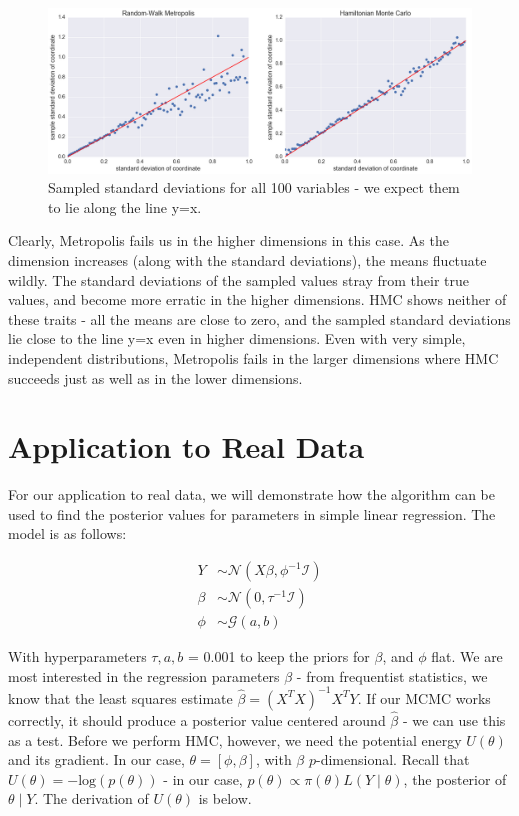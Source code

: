 \documentclass{article}
\numberwithin{equation}{section}
\begin{document}
\begin{figure}[H]
\centering
  \includegraphics[width=1\linewidth]{100d_sds.png}
  \caption{Sampled standard deviations for all 100 variables - we expect them to lie along the line y=x.}
\label{100d_sds}
\end{figure}

Clearly, Metropolis fails us in the higher dimensions in this case. As the dimension increases (along with the standard deviations), the means fluctuate wildly. The standard deviations of the sampled values stray from their true values, and become more erratic in the higher dimensions. HMC shows neither of these traits - all the means are close to zero, and the sampled standard deviations lie close to the line y=x even in higher dimensions. Even with very simple, independent distributions, Metropolis fails in the larger dimensions where HMC succeeds  just as well as in the lower dimensions. 

\section{Application to Real Data}
For our application to real data, we will demonstrate how the algorithm can be used to find the posterior values for parameters in simple linear regression. The model is as follows:

\begin{align*}
Y&\sim \mathcal{N}(X\beta, \phi^{-1}\mathcal{I})\\
\beta&\sim \mathcal{N}(0,\tau^{-1}\mathcal{I})\\
\phi&\sim \mathcal{G}(a,b)
\end{align*}

With hyperparameters $\tau,a,b$ = 0.001 to keep the priors for $\beta$, and  $\phi$ flat. We are most interested in the regression parameters $\beta$ - from frequentist statistics, we know that the least squares estimate $\hat{\beta} = (X^TX)^{-1}X^TY$. If our MCMC works correctly, it should produce a posterior value centered around $\hat{\beta}$ - we can use this as a test. Before we perform HMC, however, we need the potential energy $U(\theta)$ and its gradient. In our case, $\theta = [\phi, \beta]$, with $\beta$ $p$-dimensional. Recall that $U(\theta) = -\text{log}(p(\theta))$ - in our case, $p(\theta) \propto \pi(\theta)L(Y\mid\theta)$, the posterior of $\theta\mid Y$. The derivation of $U(\theta)$ is below.
\end{document}
